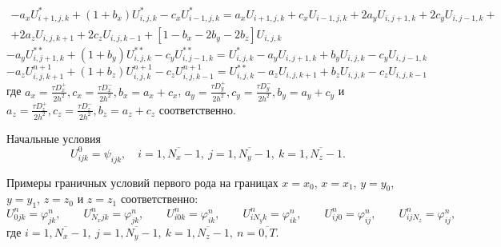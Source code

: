 \documentclass[a4paper,12pt]{article}
\begin{document}
\begin{multline*}
  - a_x U^{*}_{i+1,j,k} + \left( 1 + b_x \right) U^{*}_{i,j,k} - c_x U^{*}_{i-1,j,k}
  = a_x U_{i+1,j,k} + c_x U_{i-1,j,k} + 2a_y U_{i,j+1,k}  + 2c_y U_{i,j-1,k} + \\ + 2a_z U_{i,j,k+1} + 2c_z U_{i,j,k-1}
  + \left[ 1 - b_x - 2b_y - 2b_z \right] U_{i,j,k}
\end{multline*}
\begin{equation*}
  - a_y U^{**}_{i,j+1,k} + \left( 1  + b_y \right) U^{**}_{i,j,k} - c_y U^{**}_{i,j-1,k} =
  U^{*}_{i,j,k} - a_y U_{i,j+1,k} + b_y U_{i,j,k} - c_y U_{i,j-1,k}
\end{equation*}
\begin{equation*}
  - a_z U^{n+1}_{i,j,k+1} + \left( 1 + b_z \right) U^{n+1}_{i,j,k} - c_z U^{n+1}_{i,j,k-1} =  U^{**}_{i,j,k} - a_z U_{i,j,k+1}  + b_z U_{i,j,k} - c_z U_{i,j,k-1}
\end{equation*}
где $a_x = \frac{\tau D^+_x}{2h^2}, c_x = \frac{\tau D^-_x}{2h^2}, b_x = a_x + c_x$, $a_y = \frac{\tau D^+_y}{2h^2}, c_y = \frac{\tau D^-_y}{2h^2}, b_y = a_y + c_y$ и $a_z = \frac{\tau D^+_z}{2h^2}, c_z = \frac{\tau D^-_z}{2h^2}, b_z = a_z + c_z$ соответственно.

Начальные условия
\begin{equation*}
  U^0_{ijk} = \psi_{ijk}, \quad i = \overline {1, N_x-1}, \ j = \overline {1, N_y-1}, \ k = \overline {1, N_z-1}.
\end{equation*}

Примеры граничных условий первого рода на границах $x = x_0$, $x = x_1$, $y = y_0$, $y = y_1$, $z = z_0$ и $z = z_1$ соответственно:
\begin{equation*}
  \label{eq:3d-bc1}
  U^n_{0jk} = \varphi_{jk}^n, \qquad U^n_{N_x j k} = \varphi_{jk}^n, \qquad  U^n_{i0k} = \varphi_{ik}^n, \qquad U^n_{i N_y k} = \varphi_{ik}^n, \qquad  U^n_{ij0} = \varphi_{ij}^n, \qquad U^n_{i j N_z} = \varphi_{ij}^n,
\end{equation*}
где $i = \overline {1, N_x-1}, \ j = \overline {1, N_y-1}, \ k = \overline {1, N_z-1}, \ n = \overline{0,T}$.
\end{document}
